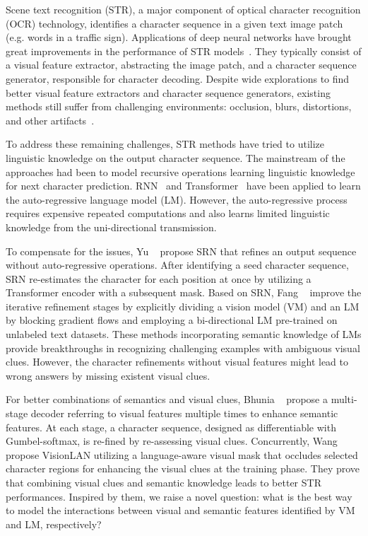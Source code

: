 \documentclass[runningheads]{llncs}
\begin{document}
Scene text recognition (STR), a major component of optical character recognition (OCR) technology, identifies a character sequence in a given text image patch (e.g. words in a traffic sign). Applications of deep neural networks have brought great improvements in the performance of STR models~\cite{Baek_2019_ICCV_CombBest,CRNN,ASTER,Wang_2020_DAN,Yu_2020_CVPR_SRN,RobustScanner}. They typically consist of a visual feature extractor, abstracting the image patch, and a character sequence generator, responsible for character decoding. Despite wide explorations to find better visual feature extractors and character sequence generators, existing methods still suffer from challenging environments: occlusion, blurs, distortions, and other artifacts~\cite{Baek_2019_ICCV_CombBest,JVSR}.

To address these remaining challenges, STR methods have tried to utilize linguistic knowledge on the output character sequence. The mainstream of the approaches had been to model recursive operations learning linguistic knowledge for next character prediction. RNN~\cite{Baek_2019_ICCV_CombBest,ASTER} and Transformer~\cite{SATRN,NRTR,Holistic} have been applied to learn the auto-regressive language model (LM). 
However, the auto-regressive process requires expensive repeated computations and also learns limited linguistic knowledge from the uni-directional transmission. 

To compensate for the issues, Yu \etal~\cite{Yu_2020_CVPR_SRN} propose SRN that refines an output sequence without auto-regressive operations. After identifying a seed character sequence, SRN re-estimates the character for each position at once by utilizing a Transformer encoder with a subsequent mask.
Based on SRN, Fang \etal~\cite{ABINet} improve the iterative refinement stages by explicitly dividing a vision model (VM) and an LM by blocking gradient flows and employing a bi-directional LM pre-trained on unlabeled text datasets. These methods incorporating semantic knowledge of LMs provide breakthroughs in recognizing challenging examples with ambiguous visual clues. 
However, the character refinements without visual features might lead to wrong answers by missing existent visual clues.

For better combinations of semantics and visual clues, Bhunia \etal~\cite{JVSR} propose a multi-stage decoder referring to visual features multiple times to enhance semantic features. At each stage, a character sequence, designed as differentiable with Gumbel-softmax, is re-fined by re-assessing visual clues.
Concurrently, Wang \etal~\cite{VisionLAN} propose VisionLAN utilizing a language-aware visual mask that occludes selected character regions for enhancing the visual clues at the training phase.
They prove that combining visual clues and semantic knowledge leads to better STR performances. 
Inspired by them, we raise a novel question: what is the best way to model the interactions between visual and semantic features identified by VM and LM, respectively?
\end{document}
